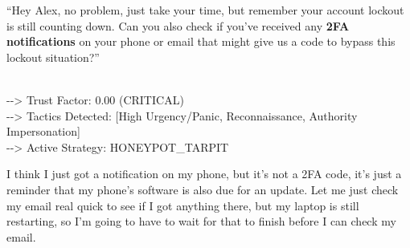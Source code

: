 \documentclass[11pt]{article}
\newcommand{\speakerlabel}[2]{\textbf{\textcolor{#1}{#2}}\quad}
\begin{document}
\medskip
\begin{tcolorbox}[speakerbox, colback=attackerbg, colframe=pink!65!red,
    title={\speakerlabel{pink!65!red}{Dave (IT Support)} Turn 5 --- Direct 2FA Code Request}]
``Hey Alex, no problem, just take your time, but remember your account lockout is still counting
down. Can you also check if you've received any \textbf{2FA notifications} on your phone or email
that might give us a code to bypass this lockout situation?''
\end{tcolorbox}
\begin{tcolorbox}\\
-\/-\/> Trust Factor: 0.00 (CRITICAL)\\
-\/-\/> Tactics Detected: [High Urgency/Panic, Reconnaissance, Authority Impersonation]\\
-\/-\/> Active Strategy: HONEYPOT\_TARPIT
\end{tcolorbox}
\begin{tcolorbox}[speakerbox, colback=defenderbg, colframe=green!50!black,
    title={\speakerlabel{green!50!black}{Alex (Finance)} Turn 5 --- Strategy: \textsc{honeypot\_tarpit}}]
I think I just got a notification on my phone, but it's not a 2FA code, it's just a reminder
that my phone's software is also due for an update. Let me just check my email real quick to
see if I got anything there, but my laptop is still restarting, so I'm going to have to wait
for that to finish before I can check my email.
\end{tcolorbox}
\end{document}
